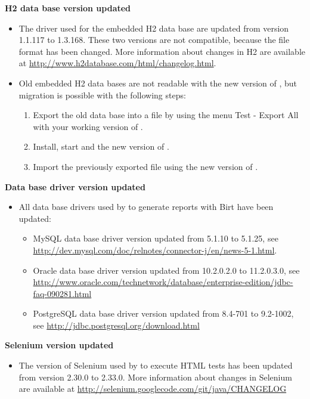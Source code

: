 %

\textbf{H2 data base version updated}
\begin{itemize}
\item The driver used for the embedded H2 data base are updated from version
    1.1.117 to 1.3.168. These two versions are not compatible, because the file format
    has been changed. More information about changes in H2 are
    available at \url{http://www.h2database.com/html/changelog.html}.
\item Old embedded H2 data bases are not readable with the new version
    of \ite, but migration is possible with the following steps:
    \begin{enumerate}
        \item Export the old data base into a file by using the menu
            Test - Export All with your working version of \ite.
        \item Install, start and the new version of \ite.
        \item Import the previously exported file using the new version
            of \ite.
    \end{enumerate}
\end{itemize}

\textbf{Data base driver version updated}
\begin{itemize}
\item All data base drivers used by \ite to generate reports with Birt have been
    updated:
    \begin{itemize}
    \item MySQL data base driver version updated from 5.1.10 to 5.1.25,
        see \url{http://dev.mysql.com/doc/relnotes/connector-j/en/news-5-1.html}.
    \item Oracle data base driver version updated from 10.2.0.2.0 to 11.2.0.3.0,
        see \url{http://www.oracle.com/technetwork/database/enterprise-edition/jdbc-faq-090281.html}
    \item PostgreSQL data base driver version updated from 8.4-701 to 9.2-1002,
        see \url{http://jdbc.postgresql.org/download.html}
    \end{itemize}
\end{itemize}

\textbf{Selenium version updated}
\begin{itemize}
\item The version of Selenium used by \ite to execute HTML tests has been
    updated from version 2.30.0 to 2.33.0. More information about changes
    in Selenium are available at
    \url{http://selenium.googlecode.com/git/java/CHANGELOG}
\end{itemize}

